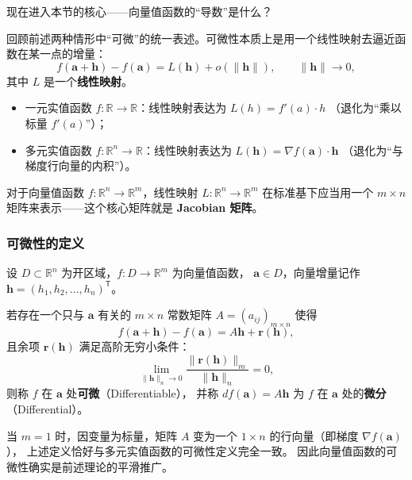 \documentclass[lang=cn,11pt]{elegantbook}
\begin{document}
现在进入本节的核心——向量值函数的“导数”是什么？

回顾前述两种情形中“可微”的统一表述。可微性本质上是用一个线性映射去逼近函数在某一点的增量：
\[
f(\boldsymbol a+\boldsymbol h)-f(\boldsymbol a)
=L(\boldsymbol h)+o(\|\boldsymbol h\|),\qquad\|\boldsymbol h\|\to 0,
\]
其中 $L$ 是一个\textbf{线性映射}。

\begin{itemize}
  \item 一元实值函数 $f:\mathbb R\to\mathbb R$：线性映射表达为 $L(h)=f'(a)\cdot h$
        （退化为“乘以标量 $f'(a)$”）；
  \item 多元实值函数 $f:\mathbb R^n\to\mathbb R$：线性映射表达为
        $L(\boldsymbol h)= \nabla f(\boldsymbol a)\cdot\boldsymbol h$
        （退化为“与梯度行向量的内积”）。
\end{itemize}

对于向量值函数 $f:\mathbb R^n\to\mathbb R^m$，线性映射 $L:\mathbb R^n\to\mathbb R^m$
在标准基下应当用一个 $m\times n$ 矩阵来表示——这个核心矩阵就是 \textbf{Jacobian 矩阵}。


\subsubsection*{可微性的定义}

\begin{definition}[向量值函数的可微性] \label{def:vec-diff}
设 $D\subset\mathbb R^n$ 为开区域，$f:D\to\mathbb R^m$ 为向量值函数，
$\boldsymbol a\in D$，向量增量记作 $\boldsymbol h=(h_1,h_2,\dots,h_n)^{\mathsf T}$。

若存在一个只与 $\boldsymbol a$ 有关的 $m\times n$ 常数矩阵 $A=(a_{ij})_{m\times n}$ 使得
\[
f(\boldsymbol a+\boldsymbol h)-f(\boldsymbol a)=A\boldsymbol h+\boldsymbol r(\boldsymbol h),
\]
且余项 $\boldsymbol r(\boldsymbol h)$ 满足高阶无穷小条件：
\[
\lim_{\|\boldsymbol h\|_n\to 0}\frac{\|\boldsymbol r(\boldsymbol h)\|_m}{\|\boldsymbol h\|_n}=0,
\]
则称 $f$ 在 $\boldsymbol a$ 处\textbf{可微}（Differentiable），
并称 $df(\boldsymbol a)=A\boldsymbol h$ 为 $f$ 在 $\boldsymbol a$ 处的\textbf{微分}（Differential）。
\end{definition}

\begin{note}[与实值函数可微性的对比]
当 $m=1$ 时，因变量为标量，矩阵 $A$ 变为一个 $1\times n$ 的行向量（即梯度 $\nabla f(\boldsymbol a)$），
上述定义恰好与多元实值函数的可微性定义完全一致。
因此向量值函数的可微性确实是前述理论的平滑推广。
\end{note}
\end{document}
